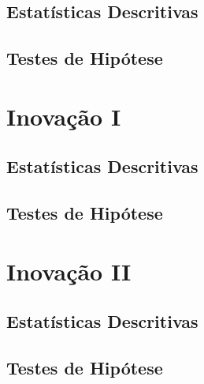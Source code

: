 \documentclass[]{book}
\begin{document}
\hypertarget{estatisticas-descritivas-12}{%
\subsection{Estatísticas Descritivas}\label{estatisticas-descritivas-12}}

\hypertarget{testes-de-hipotese-12}{%
\subsection{Testes de Hipótese}\label{testes-de-hipotese-12}}

\hypertarget{inovacao-i}{%
\section{Inovação I}\label{inovacao-i}}

\hypertarget{estatisticas-descritivas-13}{%
\subsection{Estatísticas Descritivas}\label{estatisticas-descritivas-13}}

\hypertarget{testes-de-hipotese-13}{%
\subsection{Testes de Hipótese}\label{testes-de-hipotese-13}}

\hypertarget{inovacao-ii}{%
\section{Inovação II}\label{inovacao-ii}}

\hypertarget{estatisticas-descritivas-14}{%
\subsection{Estatísticas Descritivas}\label{estatisticas-descritivas-14}}

\hypertarget{testes-de-hipotese-14}{%
\subsection{Testes de Hipótese}\label{testes-de-hipotese-14}}


\end{document}
